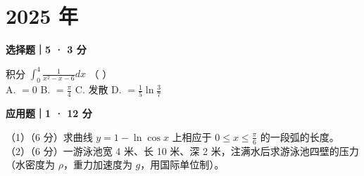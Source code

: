\section*{2025 年}


\textbf{选择题｜5 · 3 分}

积分 $\int_0^4 \frac{1}{x^2-x-6} dx$ （ \quad ）\\
A. $= 0$ \quad B. $= \frac{\pi}{4}$ \quad C. 发散 \quad D. $= \frac{1}{5}\ln\frac{3}{7}$


\textbf{应用题｜1 · 12 分}

（1）（6 分）求曲线 $y = 1 - \ln\cos x$ 上相应于 $0 \le x \le \frac{\pi}{6}$ 的一段弧的长度。\\
（2）（6 分）一游泳池宽 4 米、长 10 米、深 2 米，注满水后求游泳池四壁的压力（水密度为 $\rho$，重力加速度为 $g$，用国际单位制）。
